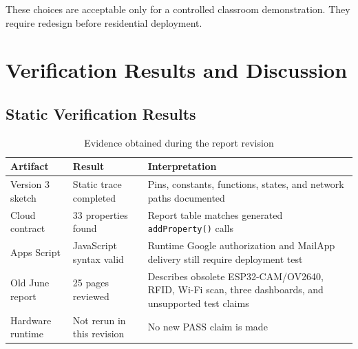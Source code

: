 \documentclass[11pt,a4paper]{report}
\begin{document}
These choices are acceptable only for a controlled classroom demonstration.
They require redesign before residential deployment.

\chapter{Verification Results and Discussion}

\section{Static Verification Results}
\begin{table}[H]
\centering
\caption{Evidence obtained during the report revision}
\begin{tabularx}{\textwidth}{p{4.1cm}p{2.6cm}X}
\toprule
\textbf{Artifact} & \textbf{Result} & \textbf{Interpretation}\\
\midrule
Version 3 sketch & Static trace completed & Pins, constants, functions,
states, and network paths documented\\
Cloud contract & 33 properties found & Report table matches generated
\texttt{addProperty()} calls\\
Apps Script & JavaScript syntax valid & Runtime Google authorization and
MailApp delivery still require deployment test\\
Old June report & 25 pages reviewed & Describes obsolete ESP32-CAM/OV2640,
RFID, Wi-Fi scan, three dashboards, and unsupported test claims\\
Hardware runtime & Not rerun in this revision & No new PASS claim is made\\
\bottomrule
\end{tabularx}
\end{table}
\end{document}
